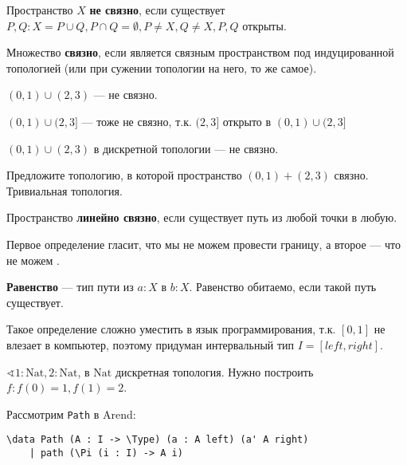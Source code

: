 \begin{definition}
    Пространство \(X\) \textbf{не связно}, если существует \(P, Q : X = P \cup Q, P \cap Q = \emptyset, P \neq X, Q \neq X, P, Q\) открыты.

    Множество \textbf{связно}, если является связным пространством под индуцированной топологией (или при сужении топологии на него, то же самое).
\end{definition}

\begin{example}
    \((0, 1) \cup (2, 3)\) --- не связно.
\end{example}

\begin{example}
    \((0, 1) \cup (2, 3]\) --- тоже не связно, т.к. \((2, 3]\) открыто в \((0, 1) \cup (2, 3]\)
\end{example}

\begin{example}
    \((0, 1) \cup (2, 3)\) в дискретной топологии --- не связно.
\end{example}

\begin{exercise}
    Предложите топологию, в которой пространство \((0, 1) + (2, 3)\) связно. Тривиальная топология.
\end{exercise}

\begin{definition}
    Пространство \textbf{линейно связно}, если существует путь из любой точки в любую.
\end{definition}

Первое определение гласит, что мы не можем провести границу, а второе --- что не можем \?. %

\begin{definition}
    \textbf{Равенство} --- тип пути из \(a : X\) в \(b : X\). Равенство обитаемо, если такой путь существует.
\end{definition}

Такое определение сложно уместить в язык программирования, т.к. \([0, 1]\) не влезает в компьютер, поэтому придуман интервальный тип \(I = [left, right]\).

\begin{example}
    \(\sphericalangle 1 : \mathrm{Nat}, 2 : \mathrm{Nat}\), в \(\mathrm{Nat}\) дискретная топология. Нужно построить \(f : f( 0) = 1, f(1) = 2\).
\end{example}

Рассмотрим \texttt{Path} в Arend:
\begin{verbatim}
\data Path (A : I -> \Type) (a : A left) (a' A right)
    | path (\Pi (i : I) -> A i)
\end{verbatim}

